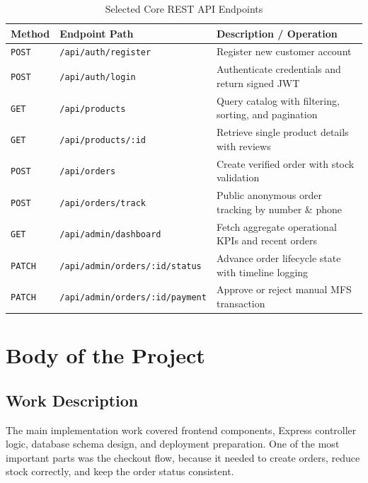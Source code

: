 \documentclass[12pt,a4paper,oneside]{report}
\begin{document}
\begin{table}[H]
\centering
\caption{Selected Core REST API Endpoints}
\label{tab:api_endpoints}
\begin{tabularx}{\textwidth}{llX}
\toprule
\textbf{Method} & \textbf{Endpoint Path} & \textbf{Description / Operation} \\
\midrule
\texttt{POST} & \texttt{/api/auth/register} & Register new customer account \\
\texttt{POST} & \texttt{/api/auth/login} & Authenticate credentials and return signed JWT \\
\texttt{GET}  & \texttt{/api/products} & Query catalog with filtering, sorting, and pagination \\
\texttt{GET}  & \texttt{/api/products/:id} & Retrieve single product details with reviews \\
\texttt{POST} & \texttt{/api/orders} & Create verified order with stock validation \\
\texttt{POST} & \texttt{/api/orders/track} & Public anonymous order tracking by number \& phone \\
\texttt{GET}  & \texttt{/api/admin/dashboard} & Fetch aggregate operational KPIs and recent orders \\
\texttt{PATCH} & \texttt{/api/admin/orders/:id/status} & Advance order lifecycle state with timeline logging \\
\texttt{PATCH} & \texttt{/api/admin/orders/:id/payment} & Approve or reject manual MFS transaction \\
\bottomrule
\end{tabularx}
\end{table}

\chapter{Body of the Project}

\section{Work Description}
The main implementation work covered frontend components, Express controller logic, database schema design, and deployment preparation. One of the most important parts was the checkout flow, because it needed to create orders, reduce stock correctly, and keep the order status consistent.
\end{document}
